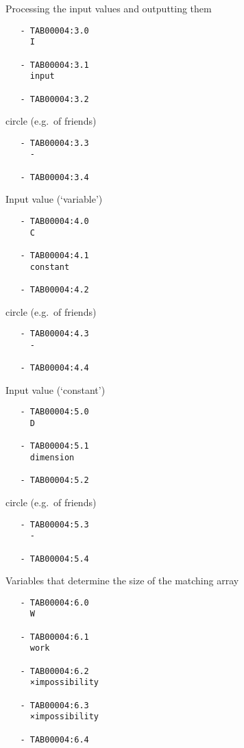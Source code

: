 Processing the input values and outputting them

\begin{verbatim}
   - TAB00004:3.0 
     I
 
   - TAB00004:3.1 
     input
 
   - TAB00004:3.2 
\end{verbatim}

circle (e.g.~of friends)

\begin{verbatim}
   - TAB00004:3.3 
     -
 
   - TAB00004:3.4 
\end{verbatim}

Input value (`variable')

\begin{verbatim}
   - TAB00004:4.0 
     C
 
   - TAB00004:4.1 
     constant
 
   - TAB00004:4.2 
\end{verbatim}

circle (e.g.~of friends)

\begin{verbatim}
   - TAB00004:4.3 
     -
 
   - TAB00004:4.4 
\end{verbatim}

Input value (`constant')

\begin{verbatim}
   - TAB00004:5.0 
     D
 
   - TAB00004:5.1 
     dimension
 
   - TAB00004:5.2 
\end{verbatim}

circle (e.g.~of friends)

\begin{verbatim}
   - TAB00004:5.3 
     -
 
   - TAB00004:5.4 
\end{verbatim}

Variables that determine the size of the matching array

\begin{verbatim}
   - TAB00004:6.0 
     W
 
   - TAB00004:6.1 
     work
 
   - TAB00004:6.2 
     ×impossibility
 
   - TAB00004:6.3 
     ×impossibility
 
   - TAB00004:6.4 
\end{verbatim}

